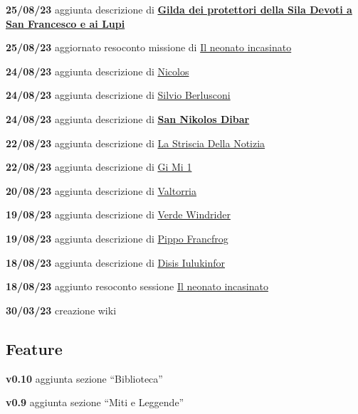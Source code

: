 \textbf{25/08/23} aggiunta descrizione di
\href{Gilda\%20dei\%20protettori\%20della\%20Sila\%20Devoti\%20a\%20San\%20Franc\%20e29bb7909af24fee931336355db913d4.md}{\textbf{Gilda
dei protettori della Sila Devoti a San Francesco e ai Lupi}}

\textbf{25/08/23} aggiornato resoconto missione di
\href{Il\%20neonato\%20incasinato\%2090743e94446c4f5a846f18c37fd80698.md}{Il
neonato incasinato}

\textbf{24/08/23} aggiunta descrizione di
\href{Nicolos\%20fac31cf73d3d4b70b068ab976e2129e1.md}{Nicolos}

\textbf{24/08/23} aggiunta descrizione di
\href{Silvio\%20Berlusconi\%2051c2a61cf7214d26a74744d6ab46e241.md}{Silvio
Berlusconi}

\textbf{24/08/23} aggiunta descrizione di
\textbf{\href{San\%20Nikolos\%20Dibar\%2025d750713dba4816a1b6771821ab3187.md}{San
Nikolos Dibar}}

\textbf{22/08/23} aggiunta descrizione di
\href{https://www.notion.so/La-Striscia-Della-Notizia-58157109cdb44626b1d92668711114d1?pvs=21}{La
Striscia Della Notizia}

\textbf{22/08/23} aggiunta descrizione di
\href{Gi\%20Mi\%201\%20cab17ff310e546dc9f1f92664fedf682.md}{Gi Mi 1}

\textbf{20/08/23} aggiunta descrizione di
\href{Valtorria\%207d27576509654ad4bfa1584e38753d6a.md}{Valtorria}

\textbf{19/08/23} aggiunta descrizione di
\href{Verde\%20Windrider\%20340b448da1954bffb62f6980be563ea2.md}{Verde
Windrider}

\textbf{19/08/23} aggiunta descrizione di
\href{Pippo\%20Francfrog\%204d15378e582d4f1db815d957fe064245.md}{Pippo
Francfrog}

\textbf{18/08/23} aggiunta descrizione di
\href{Disis\%20Iulukinfor\%20e7699726707a41be926c823d67941f78.md}{Disis
Iulukinfor}

\textbf{18/08/23} aggiunto resoconto sessione
\href{Il\%20neonato\%20incasinato\%2090743e94446c4f5a846f18c37fd80698.md}{Il
neonato incasinato}

\textbf{30/03/23} creazione wiki

\subsection{Feature}\label{feature}

\textbf{v0.10} aggiunta sezione ``Biblioteca''

\textbf{v0.9} aggiunta sezione ``Miti e Leggende''

